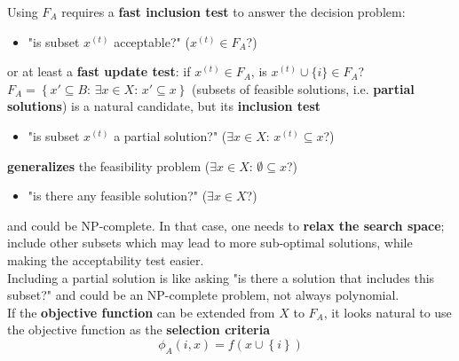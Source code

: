 Using $F_A$ requires a \textbf{fast inclusion test} to answer the decision problem:
\begin{itemize}[label*=]
	\item "is subset $x^{(t)}$ acceptable?" ($x^{(t)} \in F_A$?)
\end{itemize}
or at least a \textbf{fast update test}: if $x^{(t)} \in F_A$, is $x^{(t)} \cup \{i\} \in F_A$? \\

$F_A = \left\{x' \subseteq B : \, \exists x \in X : \, x' \subseteq x\right\}$ (subsets of feasible solutions, i.e. \textbf{partial solutions}) is a natural candidate, but its \textbf{inclusion test}
\begin{itemize}[label*=]
	\item "is subset $x^{(t)}$ a partial solution?" ($\exists x \in X : \, x^{(t)} \subseteq x$?)
\end{itemize}
\textbf{generalizes} the feasibility problem ($\exists x \in X : \, \emptyset \subseteq x$?)
\begin{itemize}[label*=]
	\item "is there any feasible solution?" ($\exists x \in X$?)
\end{itemize}
and could be NP-complete. In that case, one needs to \textbf{relax the search space}; include other subsets which may lead to more sub-optimal solutions, while making the acceptability test easier.\\

Including a partial solution is like asking "is there a solution that includes this subset?" and could be an NP-complete problem, not always polynomial.\\

If the \textbf{objective function} can be extended from $X$ to $F_A$, it looks natural to use the objective function as the \textbf{selection criteria}
$$ \phi_A (i,x) = f \left(x \cup \left\{i\right\} \right)$$

\newpage

